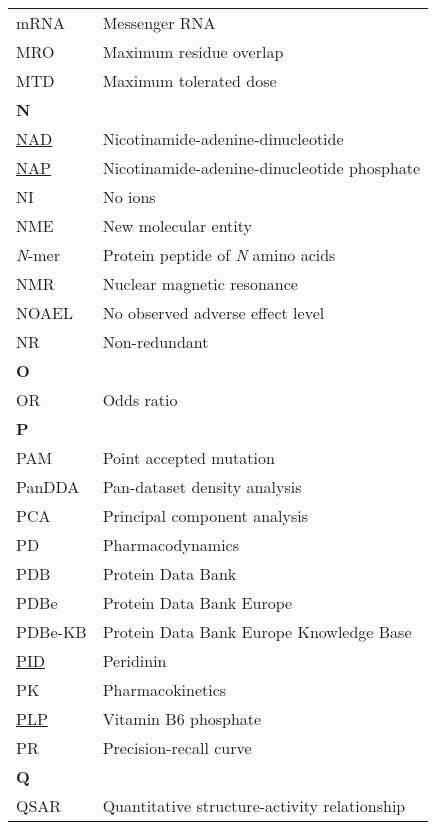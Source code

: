 \begin{longtable}[l]{@{}p{2.5cm}p{12cm}@{}}
\textmd{mRNA} & Messenger RNA \\
\textmd{MRO} & Maximum residue overlap \\
\textmd{MTD} & Maximum tolerated dose \\[0.3175cm]
\textbf{\large N} & \\[0.25cm]
\textmd{\href{https://www.ebi.ac.uk/pdbe-srv/pdbechem/chemicalCompound/show/NAD}{NAD}} & Nicotinamide-adenine-dinucleotide \\
\textmd{\href{https://www.ebi.ac.uk/pdbe-srv/pdbechem/chemicalCompound/show/NAP}{NAP}} & Nicotinamide-adenine-dinucleotide phosphate \\
\textmd{NI} & No ions \\
\textmd{NME} & New molecular entity \\
\textmd{\textit{N}-mer} & Protein peptide of \textit{N} amino acids \\
\textmd{NMR} & Nuclear magnetic resonance \\
\textmd{NOAEL} & No observed adverse effect level \\
\textmd{NR} & Non-redundant \\[0.3175cm]
\textbf{\large O} & \\[0.25cm]
\textmd{OR} & Odds ratio \\[0.3175cm]
\textbf{\large P} & \\[0.25cm]
\textmd{PAM} & Point accepted mutation \\
\textmd{PanDDA} & Pan-dataset density analysis \\
\textmd{PCA} & Principal component analysis \\
\textmd{PD} & Pharmacodynamics \\ 
\textmd{PDB} & Protein Data Bank \\
\textmd{PDBe} & Protein Data Bank Europe \\
\textmd{PDBe-KB} & Protein Data Bank Europe Knowledge Base \\
\textmd{\href{https://www.ebi.ac.uk/pdbe-srv/pdbechem/chemicalCompound/show/PID}{PID}} & Peridinin \\
\textmd{PK} & Pharmacokinetics \\
\textmd{\href{https://www.ebi.ac.uk/pdbe-srv/pdbechem/chemicalCompound/show/PLP}{PLP}} & Vitamin B6 phosphate \\
\textmd{PR} & Precision-recall curve \\[0.3175cm]
\textbf{\large Q} & \\[0.25cm]
\textmd{QSAR} & Quantitative structure-activity relationship \\[0.3175cm]

\end{longtable}
